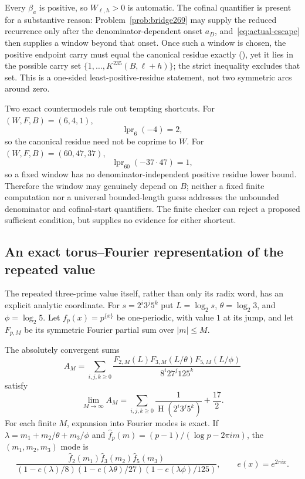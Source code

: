 \documentclass[11pt]{article}
\newcommand{\hgt}{\operatorname{H}}
\begin{document}
Every $\beta_a$ is positive, so $W_{\ell,h}>0$ is automatic.  The cofinal
quantifier is present for a substantive reason: Problem~\ref{prob:bridge269}
may supply the reduced recurrence only after the denominator-dependent onset
$a_D$, and~\eqref{eq:actual-escape} then supplies a window beyond that onset.
Once such a window is chosen, the positive endpoint carry must equal the
canonical residue exactly
(),
yet it lies in the possible carry set
$\{1,\ldots,K^{235}(B,\ell+h)\}$; the strict inequality excludes that set.
This is a one-sided least-positive-residue statement, not two symmetric arcs
around zero.

Two exact countermodels rule out tempting shortcuts.  For $(W,F,B)=(6,4,1)$,
\[
 \operatorname{lpr}_{6}(-4)=2,
\]
so the canonical residue need not be coprime to $W$.  For
$(W,F,B)=(60,47,37)$,
\[
 \operatorname{lpr}_{60}(-37\cdot47)=1,
\]
so a fixed window has no denominator-independent positive residue lower
bound.  Therefore the window may genuinely depend on $B$; neither a fixed
finite computation nor a universal bounded-length guess addresses the
unbounded denominator and cofinal-start quantifiers.  The finite checker can
reject a proposed sufficient condition, but supplies no evidence for either
shortcut.

\subsection{An exact torus--Fourier representation of the repeated value}

The repeated three-prime value itself, rather than only its radix word, has
an explicit analytic coordinate.  For $s=2^i3^j5^k$ put
$L=\log_2s$, $\theta=\log_2 3$, and $\phi=\log_2 5$.  Let
$f_p(x)=p^{\{x\}}$ be one-periodic, with value $1$ at its jump, and let
$F_{p,M}$ be its symmetric Fourier partial sum over $|m|\le M$.

\begin{theorem}
\label{res:torus-fourier-value}
The absolutely convergent sums
\[
 A_M=\sum_{i,j,k\ge0}
 \frac{F_{2,M}(L)F_{3,M}(L/\theta)F_{5,M}(L/\phi)}
      {8^i27^j125^k}
\]
satisfy
\[
 \lim_{M\to\infty}A_M
 =\sum_{i,j,k\ge0}\frac1{\hgt(2^i3^j5^k)}+\frac{17}{2}.
 \tag{9.6}\label{eq:torus-fourier-value}
\]
For each finite $M$, expansion into Fourier modes is exact.  If
$\lambda=m_1+m_2/\theta+m_3/\phi$ and
$\widehat f_p(m)=(p-1)/(\log p-2\pi i m)$, the $(m_1,m_2,m_3)$ mode is
\[
 \frac{\widehat f_2(m_1)\widehat f_3(m_2)\widehat f_5(m_3)}
 {(1-e(\lambda)/8)(1-e(\lambda\theta)/27)
  (1-e(\lambda\phi)/125)},
 \qquad e(x)=e^{2\pi i x}.
\]
\end{theorem}
\end{document}
